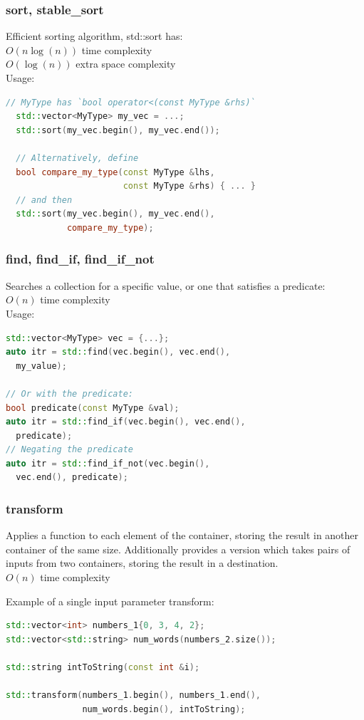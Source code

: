 \documentclass{beamer}
\begin{document}
\begin{frame}[fragile]
  \frametitle{sort, stable\_sort}
  Efficient sorting algorithm, std::sort has:\\
  $O(n \log(n))$ time complexity\\
  $O(\log(n))$ extra space complexity\\
  Usage:
  \begin{lstlisting}[language=C++]
  // MyType has `bool operator<(const MyType &rhs)`
  std::vector<MyType> my_vec = ...;
  std::sort(my_vec.begin(), my_vec.end());

  // Alternatively, define
  bool compare_my_type(const MyType &lhs,
                       const MyType &rhs) { ... }
  // and then
  std::sort(my_vec.begin(), my_vec.end(),
            compare_my_type);
  \end{lstlisting}
\end{frame}

\begin{frame}[fragile]
  \frametitle{find, find\_if, find\_if\_not}
  Searches a collection for a specific value, or one that satisfies a predicate:\\
  $O(n)$ time complexity\\
  Usage:
  \begin{lstlisting}[language=C++]
std::vector<MyType> vec = {...};
auto itr = std::find(vec.begin(), vec.end(),
  my_value);

// Or with the predicate:
bool predicate(const MyType &val);
auto itr = std::find_if(vec.begin(), vec.end(),
  predicate);
// Negating the predicate
auto itr = std::find_if_not(vec.begin(),
  vec.end(), predicate);
  \end{lstlisting}
\end{frame}

\begin{frame}[fragile]
  \frametitle{transform}
  Applies a function to each element of the container,
  storing the result in another container of the same size.
  Additionally provides a version which takes pairs of inputs from two containers,
  storing the result in a destination.\\
  $O(n)$ time complexity

  Example of a single input parameter transform:
  \begin{lstlisting}[language=C++]
std::vector<int> numbers_1{0, 3, 4, 2};
std::vector<std::string> num_words(numbers_2.size());

std::string intToString(const int &i);

std::transform(numbers_1.begin(), numbers_1.end(),
               num_words.begin(), intToString);
  \end{lstlisting}
\end{frame}
\end{document}
